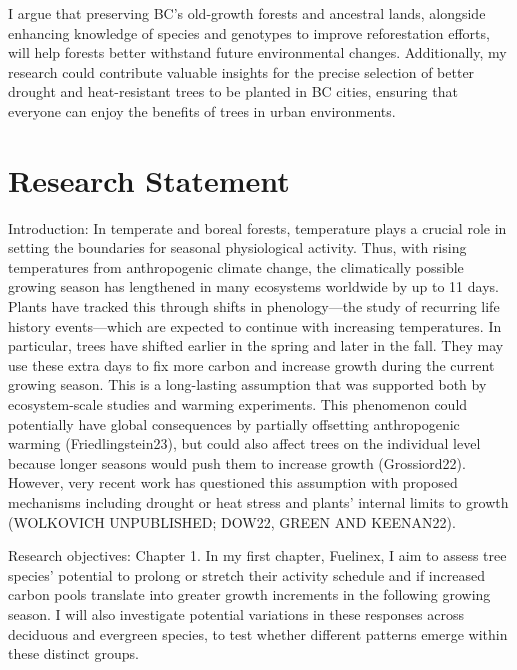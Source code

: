 \documentclass[11pt,letter]{article}
\begin{document}
I argue that preserving BC's old-growth forests and ancestral lands, alongside enhancing knowledge of species and genotypes to improve reforestation efforts, will help forests better withstand future environmental changes. Additionally, my research could contribute valuable insights for the precise selection of better drought and heat-resistant trees to be planted in BC cities, ensuring that everyone can enjoy the benefits of trees in urban environments.
\section {Research Statement}
Introduction: In temperate and boreal forests, temperature plays a crucial role in setting the boundaries for seasonal physiological activity. Thus, with rising temperatures from anthropogenic climate change, the climatically possible growing season has lengthened in many ecosystems worldwide by up to 11 days. \citep{korner_phenology_2010, menzel_growing_1999} Plants have tracked this through shifts in phenology—the study of recurring life history events—which are expected to continue with increasing temperatures. \citep{wolkovich_warming_2012} In particular, trees have shifted earlier in the spring and later in the fall. They may use these extra days to fix more carbon and increase growth during the current growing season. \citep{keenan_net_2014, wang_interactive_2020}  This is a long-lasting assumption that was supported both by ecosystem-scale studies and warming experiments. This phenomenon could potentially have global consequences by partially offsetting anthropogenic warming (Friedlingstein23), but could also affect trees on the individual level because longer seasons would push them to increase growth (Grossiord22). However, very recent work has questioned this assumption with proposed mechanisms including drought or heat stress and plants' internal limits to growth (WOLKOVICH UNPUBLISHED; DOW22, GREEN AND KEENAN22). 
\par
Research objectives:
Chapter 1. In my first chapter, Fuelinex, I aim to assess tree species’ potential to prolong or stretch their activity schedule and if increased carbon pools translate into greater growth increments in the following growing season. I will also investigate potential variations in these responses across deciduous and evergreen species, to test whether different patterns emerge within these distinct groups.\\ 
\end{document}
